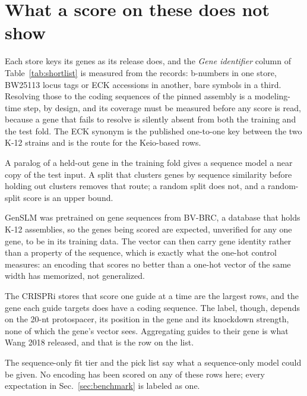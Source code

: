 
\section{What a score on these does not show}\label{sec:caveats}

 Each store keys its genes as its
release does, and the \emph{Gene identifier} column of Table~\ref{tab:shortlist} is
measured from the records: b-numbers in one store, BW25113 locus tags or ECK accessions
in another, bare symbols in a third. Resolving those to the coding sequences of the
pinned assembly is a modeling-time step, by design, and its coverage must be measured
before any score is read, because a gene that fails to resolve is silently absent from
both the training and the test fold. The ECK synonym is the published one-to-one key
between the two K-12 strains and is the route for the Keio-based rows.

 A paralog of a held-out gene in the
training fold gives a sequence model a near copy of the test input. A split that
clusters genes by sequence similarity before holding out clusters removes that route; a
random split does not, and a random-split score is an upper bound.

 GenSLM was
pretrained on gene sequences from BV-BRC, a database that holds  K-12
assemblies, so the genes being scored are expected, unverified for any one gene, to be
in its training data. The vector can then carry gene identity rather than a property
of the sequence, which is exactly what the one-hot control measures: an encoding that
scores no better than a one-hot vector of the same width has memorized, not
generalized.

 The \guideStoreCount{} CRISPRi
stores that score one guide at a time are the largest  rows, and the gene
each guide targets does have a coding sequence. The label, though, depends on the 20-nt
protospacer, its position in the gene and its knockdown strength, none of which the
gene's vector sees. Aggregating guides to their gene is what Wang 2018 released, and
that is the row on the list.

 The sequence-only fit tier and the pick list say what
a sequence-only model could be given. No encoding has been scored on any of these rows
here; every expectation in Sec.~\ref{sec:benchmark} is labeled as one.
